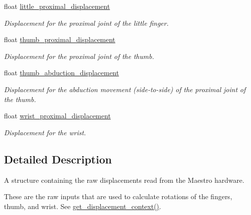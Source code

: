 \begin{DoxyCompactItemize}
\mbox{\label{struct_displacement_context_a767fa27546c037a4cd55c47907141933}} 
float \hyperlink{struct_displacement_context_a767fa27546c037a4cd55c47907141933}{little\+\_\+proximal\+\_\+displacement}
\begin{DoxyCompactList}\small\item\em Displacement for the proximal joint of the little finger. \end{DoxyCompactList}\item 
\mbox{\label{struct_displacement_context_a830da841fb1dcfa5d6a4d72559957dfe}} 
float \hyperlink{struct_displacement_context_a830da841fb1dcfa5d6a4d72559957dfe}{thumb\+\_\+proximal\+\_\+displacement}
\begin{DoxyCompactList}\small\item\em Displacement for the proximal joint of the thumb. \end{DoxyCompactList}\item 
\mbox{\label{struct_displacement_context_a34ad5545b9733899c469e067bfb240d4}} 
float \hyperlink{struct_displacement_context_a34ad5545b9733899c469e067bfb240d4}{thumb\+\_\+abduction\+\_\+displacement}
\begin{DoxyCompactList}\small\item\em Displacement for the abduction movement (side-\/to-\/side) of the proximal joint of the thumb. \end{DoxyCompactList}\item 
\mbox{\label{struct_displacement_context_a674146b3db62a0940e375287499adbc2}} 
float \hyperlink{struct_displacement_context_a674146b3db62a0940e375287499adbc2}{wrist\+\_\+proximal\+\_\+displacement}
\begin{DoxyCompactList}\small\item\em Displacement for the wrist. \end{DoxyCompactList}\end{DoxyCompactItemize}


\subsection{Detailed Description}
A structure containing the raw displacements read from the Maestro hardware. 

These are the raw inputs that are used to calculate rotations of the fingers, thumb, and wrist. See {\ttfamily \hyperlink{group__displacement_access_ga26563f1c104bd9a0d80ab8c0afd1e8bd}{get\+\_\+displacement\+\_\+context()}}. 